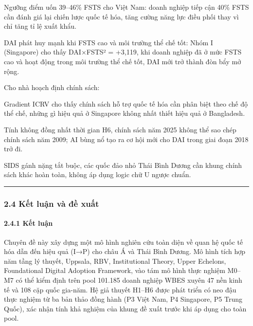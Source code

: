 \documentclass[12pt,a4paper]{article}
\begin{document}
Ngưỡng điểm uốn 39--46\% FSTS cho Việt Nam: doanh nghiệp tiếp cận 40\%
FSTS cần đánh giá lại chiến lược quốc tế hóa, tăng cường năng lực điều
phối thay vì chỉ tăng tỉ lệ xuất khẩu.

DAI phát huy mạnh khi FSTS cao và môi trường thể chế tốt: Nhóm I
(Singapore) cho thấy DAI×FSTS² = +3,119, khi doanh nghiệp đã ở mức FSTS
cao và hoạt động trong môi trường thể chế tốt, DAI mới trở thành đòn bẩy
mở rộng.

Cho nhà hoạch định chính sách:

Gradient ICRV cho thấy chính sách hỗ trợ quốc tế hóa cần phân biệt theo
chế độ thể chế, những gì hiệu quả ở Singapore không nhất thiết hiệu quả
ở Bangladesh.

Tính không đồng nhất thời gian H6, chính sách năm 2025 không thể sao
chép chính sách năm 2009; AI bùng nổ tạo ra cơ hội mới cho DAI trong
giai đoạn 2018 trở đi.

SIDS gánh nặng tắt buộc, các quốc đảo nhỏ Thái Bình Dương cần khung
chính sách khác hoàn toàn, không áp dụng logic chữ U ngược chuẩn.

\begin{center}\rule{0.5\linewidth}{0.5pt}\end{center}

\hypertarget{24-kux1ebft-luux1eadn-vuxe0-ux111ux1ec1-xuux1ea5t}{%
\subsubsection{2.4 Kết luận và đề
xuất}\label{24-kux1ebft-luux1eadn-vuxe0-ux111ux1ec1-xuux1ea5t}}

\hypertarget{241-kux1ebft-luux1eadn}{%
\paragraph{2.4.1 Kết luận}\label{241-kux1ebft-luux1eadn}}

Chuyên đề này xây dựng một mô hình nghiên cứu toàn diện về quan hệ quốc
tế hóa dẫn đến hiệu quả (I→P) cho châu Á và Thái Bình Dương. Mô hình
tích hợp năm tầng lý thuyết, Uppsala, RBV, Institutional Theory, Upper
Echelons, Foundational Digital Adoption Framework, vào tám mô hình thực
nghiệm M0--M7 có thể kiểm định trên pool 101.185 doanh nghiệp WBES xuyên
47 nền kinh tế và 108 cặp quốc gia-năm. Hệ giả thuyết H1--H6 được phát
triển có neo đậu thực nghiệm từ ba bản thảo đồng hành (P3 Việt Nam, P4
Singapore, P5 Trung Quốc), xác nhận tính khả nghiệm của khung đề xuất
trước khi áp dụng cho toàn pool.
\end{document}
